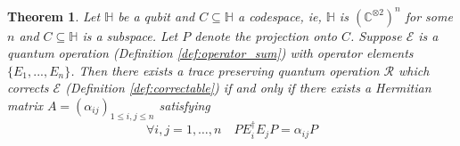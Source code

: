 \documentclass[12pt]{article}
\theoremstyle{plain}
\newtheorem{thm}{Theorem}[subsection] %
\theoremstyle{definition}
\newcommand{\bb}[1]{\mathbb{#1}}
\newcommand{\call}[1]{\mathcal{#1}}
\begin{document}
\begin{thm}\label{thm:general_error_correction}
	Let $\bb{H}$ be a qubit and $C \subseteq \bb{H}$ a codespace, ie, $\bb{H}$ is $(\bb{C}^{\otimes 2})^n$ for some $n$ and $C \subseteq \bb{H}$ is a subspace. Let $P$ denote the projection onto $C$. Suppose $\call{E}$ is a quantum operation (Definition \ref{def:operator_sum}) with operator elements $\lbrace E_1,...,E_n\rbrace$. Then there exists a trace preserving quantum operation $\call{R}$ which corrects $\call{E}$ (Definition \ref{def:correctable}) if and only if there exists a Hermitian matrix $A = (\alpha_{ij})_{1 \leq i,j \leq n}$ satisfying
	\begin{equation}\label{eq:error_correction_conditions}
		\forall i, j =1,\ldots, n\quad PE_i^\dagger E_j P = \alpha_{ij}P
	\end{equation}
\end{thm}
\end{document}

